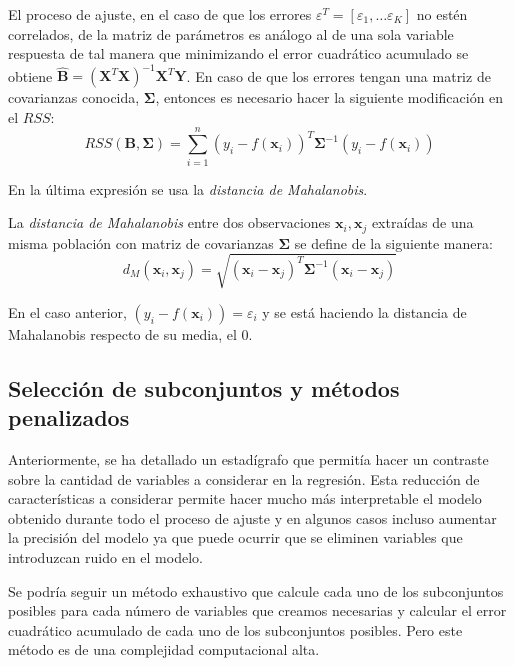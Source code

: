 \noindent El proceso de ajuste, en el caso de que los errores $\varepsilon^T=[\varepsilon_1,\ldots \varepsilon_K]$ no estén correlados, de la matriz de parámetros es análogo al de una sola variable respuesta de tal manera que minimizando el error cuadrático acumulado se obtiene $\hat{\textbf{B}}=(\textbf{X}^T\textbf{X})^{-1}\textbf{X}^T\textbf{Y}$. En caso de que los errores tengan una matriz de covarianzas conocida, $\mathbf{\Sigma}$, entonces es necesario hacer la siguiente modificación en el $RSS$:
\begin{equation}
RSS(\textbf{B},\mathbf{\Sigma})=\sum_{i=1}^n(y_i-f(\textbf{x}_i))^T \mathbf{\Sigma}^{-1} (y_i-f(\textbf{x}_i))
\end{equation}

\noindent En la última expresión se usa la \textit{distancia de Mahalanobis}.
\begin{defi}\label{Mahalanobis}
La \textit{distancia de Mahalanobis} entre dos observaciones $\textbf{x}_i, \textbf{x}_j$ extraídas de una misma población con matriz de covarianzas $\mathbf{\Sigma}$ se define de la siguiente manera\cite{Cuadras 2014}: 
\begin{equation}
d_M(\textbf{x}_i, \textbf{x}_j)=\sqrt{(\textbf{x}_i- \textbf{x}_j)^T \mathbf{\Sigma}^{-1}(\textbf{x}_i-\textbf{x}_j)}
\end{equation}
\end{defi}

\noindent En el caso anterior, $(y_i-f(\textbf{x}_i))=\varepsilon_i$ y se está haciendo la distancia de Mahalanobis respecto de su media, el 0. 


\subsection*{Selección de subconjuntos y métodos penalizados}

\noindent Anteriormente, se ha detallado un estadígrafo que permitía hacer un contraste sobre la cantidad de variables a considerar en la regresión. 
Esta reducción de características a considerar permite hacer mucho más interpretable el modelo obtenido durante todo el proceso de ajuste y en algunos casos incluso aumentar la precisión del modelo ya que puede ocurrir que se eliminen variables que introduzcan ruido en el modelo. 

\noindent Se podría seguir un método exhaustivo que calcule cada uno de los subconjuntos posibles para cada número de variables que creamos necesarias y calcular el error cuadrático acumulado de cada uno de los subconjuntos posibles. Pero este método es de una complejidad computacional alta. 

